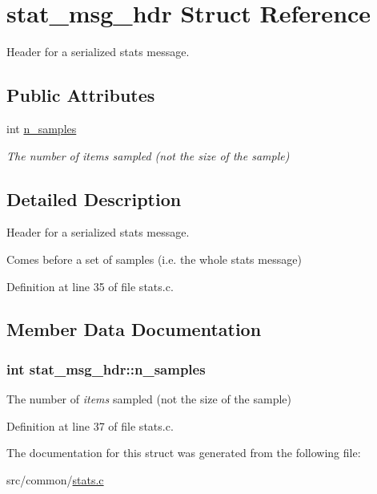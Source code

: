 \hypertarget{structstat__msg__hdr}{\section{stat\-\_\-msg\-\_\-hdr Struct Reference}
\label{structstat__msg__hdr}
}


Header for a serialized stats message.  


\subsection*{Public Attributes}
\begin{DoxyCompactItemize}
\item 
int \hyperlink{structstat__msg__hdr_a9fc1e11955b79c568df90e50b68b44b5}{n\-\_\-samples}
\begin{DoxyCompactList}\small\item\em The number of {\itshape items} sampled (not the size of the sample) \end{DoxyCompactList}\end{DoxyCompactItemize}


\subsection{Detailed Description}
Header for a serialized stats message. 

Comes before a set of samples (i.\-e. the whole stats message) 

Definition at line 35 of file stats.\-c.



\subsection{Member Data Documentation}
\hypertarget{structstat__msg__hdr_a9fc1e11955b79c568df90e50b68b44b5}{
\subsubsection[{n\-\_\-samples}]{\setlength{\rightskip}{0pt plus 5cm}int stat\-\_\-msg\-\_\-hdr\-::n\-\_\-samples}}\label{structstat__msg__hdr_a9fc1e11955b79c568df90e50b68b44b5}


The number of {\itshape items} sampled (not the size of the sample) 



Definition at line 37 of file stats.\-c.



The documentation for this struct was generated from the following file\-:\begin{DoxyCompactItemize}
\item 
src/common/\hyperlink{stats_8c}{stats.\-c}\end{DoxyCompactItemize}
